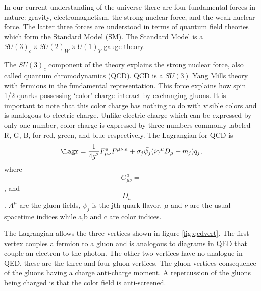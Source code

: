 
In our current understanding of the universe there are four fundamental forces in nature: gravity, electromagnetism, the strong nuclear force, and the weak nuclear force.
The latter three forces are understood in terms of quantum field theories which form the Standard Model (SM).
The Standard Model is a $SU(3)_c\times SU(2)_W\times U(1)_Y$ gauge theory.

The $SU(3)_c$ component of the theory explains the strong nuclear force, also called quantum chromodynamics (QCD).
QCD is a $SU(3)$ Yang Mills theory with fermions in the fundamental representation.
This force explains how spin 1/2 quarks possessing `color' charge interact by exchanging gluons.
It is important to note that this color charge has nothing to do with visible colors and is analogous to electric charge.
Unlike electric charge which can be expressed by only one number, color charge is expressed by three numbers commonly labeled R, G, B, for red, green, and blue respectively.
The Lagrangian for QCD is
\begin{equation}
\label{eq:qcd}
  \Lagr = \frac{1}{4g^2}F^a_{\mu\nu}F^{\mu\nu,a}+\sigma_j \bar{\psi_j}(i\gamma^\mu D_\mu+m_j)q_j,
\end{equation}
where
\begin{equation}
  G^a_{\mu\nu}=
\end{equation},
and
\begin{equation}
  D_u=
\end{equation}.
$A^\mu$ are the gluon fields, $\psi_j$ is the jth quark flavor.
$\mu$ and $\nu$ are the usual spacetime indices while a,b and c are color indices.

The Lagrangian allows the three vertices shown in figure \ref{fig:qcdvert}.
The first vertex couples a fermion to a gluon and is analogous to diagrams in QED that couple an electron to the photon.
The other two vertices have no analogue in QED, these are the three and four gluon vertices.
The gluon vertices consequence of the gluons having a charge anti-charge moment.
A repercussion of the gluons being charged is that the color field is anti-screened.

